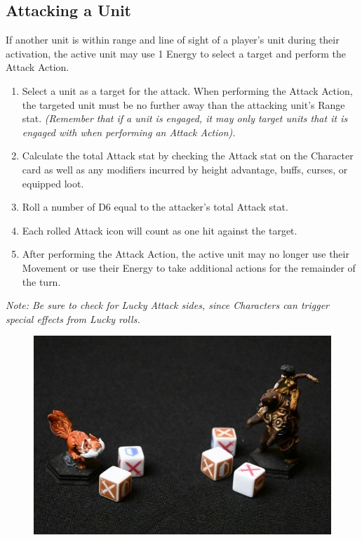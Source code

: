 \documentclass[../main.tex]{subfiles}
\begin{document}
\subsection{Attacking a Unit}
If another unit is within range and line of sight of a player’s unit during their activation, the active unit may use 1 Energy to select a target and perform the Attack Action.
\begin{enumerate}
    \item Select a unit as a target for the attack. When performing the Attack Action, the targeted unit must be no further away than the attacking unit’s Range stat. \textit{(Remember that if a unit is engaged, it may only target units that it is engaged with when performing an Attack Action).}
    \item Calculate the total Attack stat by checking the Attack stat on the Character card as well as any modifiers incurred by height advantage, buffs, curses, or equipped loot.
    \item Roll a number of D6 equal to the attacker’s total Attack stat.
    \item Each rolled Attack icon will count as one hit against the target.
    \item After performing the Attack Action, the active unit may no longer use their Movement or use their Energy to take additional actions for the remainder of the turn.
\end{enumerate}

\textit{Note: Be sure to check for Lucky Attack sides, since Characters can trigger special effects from Lucky rolls.}
\begin{figure}[h]
    \centering
    \includegraphics[width=1\linewidth]{chapters//TargetingandCombat/TimeStrikeAttacking.jpg} 
\end{figure}
\end{document}
